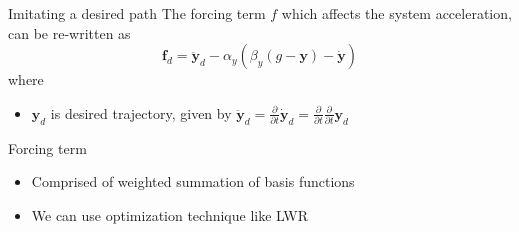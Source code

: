 \documentclass[aspectratio=43,11pt,xcolor={dvipsnames}]{beamer}
\begin{document}
\begin{frame}[noframenumbering]{Imitating a desired path}
	\linespread{1.4}
	The forcing term $f$ which affects the system acceleration, can be re-written as
	\begin{equation}
		\textbf{f}_d = \ddot{\textbf{y}}_d - \alpha_y ( \beta_y (g - \textbf{y}) - \dot{\textbf{y}})
		\label{eq:imitate_f}
	\end{equation}
	where
	\begin{itemize}
		\item $\textbf{y}_d$ is desired trajectory, given by $\ddot{\textbf{y}}_d = \frac{\partial}{\partial t} \dot{\textbf{y}}_d = \frac{\partial}{\partial t} \frac{\partial}{\partial t} \textbf{y}_d$
	\end{itemize}
															
	\begin{exampleblock}{Forcing term}					
		\begin{itemize}
			\item Comprised of weighted summation of basis functions
			\item We can use optimization technique like LWR\footnotemark
		\end{itemize}
	\end{exampleblock}
					
\end{frame}
\end{document}

